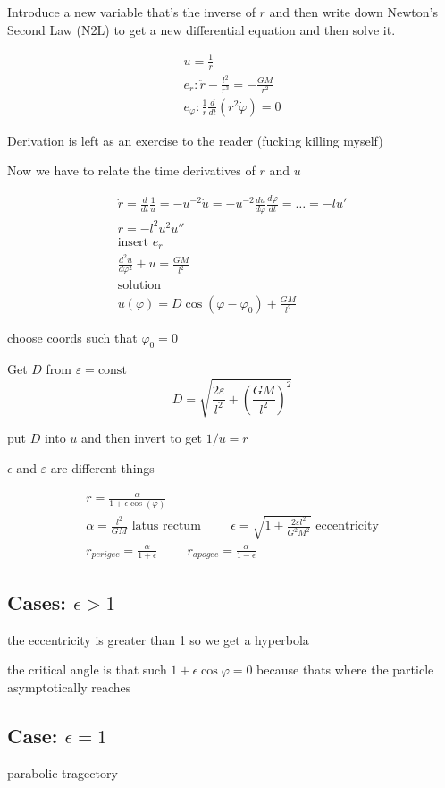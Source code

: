 \documentclass[fleqn]{report}
\newcommand{\hp}{\hspace{1cm}}
\newcommand{\const}{\textrm{const}}
\newcommand{\equations} [1] {
\begin{gather*}
#1
\end{gather*}
}
\begin{document}
Introduce a new variable that's the inverse of $r$ and then write down Newton's Second Law (N2L) to get a new differential equation and then solve it. 

\equations{
    u = \frac{1}{r}
    \\
    e_r: \ddot r - \frac{l^2}{r^3} = - \frac{GM}{r^2}
    \\
    e_\varphi : \frac{1}{r} \frac{d}{dt} (r^2 \dot \varphi) = 0
}
Derivation is left as an exercise to the reader (fucking killing myself)

Now we have to relate the time derivatives of $r$ and $u$

\equations{
    \dot r = \frac{d}{dt} \frac{1}{u} = 
    -u^{-2} \dot u = -u^{-2} \frac{du}{d \varphi } \frac{d \varphi}{dt}
    = \ldots =
    -l u'
    \\
    \ddot r = - l^2 u^2 u''
    \\
    \textrm{insert $e_r$}
    \\
    \frac{d^2 u}{d \varphi^2} + u = \frac{GM}{l^2}
    \\
    \textrm{solution}
    \\
    u(\varphi) = D \cos(\varphi - \varphi_0) + \frac{GM}{l^2}
}

choose coords such that $\varphi_0 = 0$

Get $D$ from $\varepsilon = \const$ 
\[
D = \sqrt{\frac{2 \varepsilon}{l^2} + \left(\frac{GM}{l^2}\right)^2}
\]

put $D$ into $u$ and then invert to get $1/u = r$

$\epsilon$ and $\varepsilon$ are different things 
\equations{
    r =
    \frac{\alpha}{1 + \epsilon \cos (\varphi)}
    \\
    \alpha = \frac{l^2}{GM} \textrm{ latus rectum}
    \hp
    \epsilon = \sqrt{1 + \frac{2 \varepsilon l^2}{G^2M^2}}
    \textrm{ eccentricity}
    \\
    r_{perigee} = 
    \frac{\alpha}{1 + \epsilon }
    \hp
    r_{apogee} = 
    \frac{\alpha}{1 - \epsilon }
}

\subsection{Cases: $\epsilon > 1$}
the eccentricity is greater than 1 so we get a hyperbola 

the critical angle is that such $1 + \epsilon \cos \varphi = 0$ because thats where the particle asymptotically reaches

\subsection{Case: $\epsilon = 1$}
parabolic tragectory 
\end{document}
